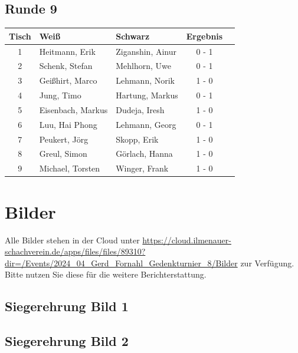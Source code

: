 \documentclass[a4paper,ngerman]{tui-algo-seminar}
\begin{document}
\subsection{Runde 9}
\begin{center}
\begin{tabular}{cllcl}
\toprule
\textbf{Tisch} & \textbf{Weiß} & \textbf{Schwarz} & \textbf{Ergebnis} \\
\midrule
1 & Heitmann, Erik & Ziganshin, Ainur & 0 - 1 \\
2 & Schenk, Stefan & Mehlhorn, Uwe & 0 - 1 \\
3 & Geißhirt, Marco & Lehmann, Norik & 1 - 0 \\
4 & Jung, Timo & Hartung, Markus & 0 - 1 \\
5 & Eisenbach, Markus & Dudeja, Iresh & 1 - 0 \\
6 & Luu, Hai Phong & Lehmann, Georg & 0 - 1 \\
7 & Peukert, Jörg & Skopp, Erik & 1 - 0 \\
8 & Greul, Simon & Görlach, Hanna & 1 - 0 \\
9 & Michael, Torsten & Winger, Frank & 1 - 0 \\
\bottomrule
\end{tabular}
\end{center}
\clearpage

\section{Bilder}
Alle Bilder stehen in der Cloud unter \url{https://cloud.ilmenauer-schachverein.de/apps/files/files/89310?dir=/Events/2024_04_Gerd_Fornahl_Gedenkturnier_8/Bilder} zur Verfügung. Bitte nutzen Sie diese für die weitere Berichterstattung.

\subsection{Siegerehrung Bild 1}
\begin{center}
    \label{fig:gerd_fornahl_1}
\end{center}

\clearpage

\subsection{Siegerehrung Bild 2}
\begin{center}
    \label{fig:gerd_fornahl_2}
\end{center}
\end{document}
